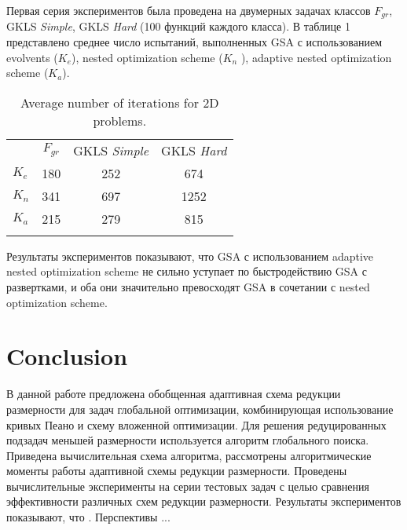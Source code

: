 \documentclass[runningheads]{llncs}
\begin{document}
Первая серия экспериментов была проведена на двумерных задачах классов $F_{gr}$, GKLS \textit{Simple}, GKLS \textit{Hard} (100 функций каждого класса). В таблице 1  представлено среднее число испытаний, выполненных GSA с использованием evolvents ($K_e$), nested optimization scheme ($K_n$ ), adaptive nested optimization scheme ($K_a$).

\begin{table}
\centering
\caption{Average number of iterations for 2D problems.}\label{tab1}
\begin{tabular}{lccc}
\hline\noalign{\smallskip}
 &  $F_{gr}$  &  GKLS \textit{Simple} &  GKLS \textit{Hard} \\
\noalign{\smallskip}\hline\noalign{\smallskip}
 $K_e$ & 180  & 252 & 674 \\
 $K_n$ & 341  & 697 & 1252 \\
 $K_a$ & 215  & 279 & 815 \\
\noalign{\smallskip}\hline
\end{tabular}
\end{table}


Результаты экспериментов показывают, что GSA с использованием adaptive nested optimization scheme не сильно уступает по быстродействию GSA с развертками, и оба они значительно превосходят GSA в сочетании с nested optimization scheme. 


\section{Conclusion}

В данной работе предложена обобщенная адаптивная схема редукции размерности для задач глобальной оптимизации, комбинирующая использование кривых Пеано и схему вложенной оптимизации. Для решения редуцированных подзадач меньшей размерности используется алгоритм глобального поиска. Приведена вычислительная схема алгоритма, рассмотрены алгоритмические моменты работы адаптивной схемы редукции размерности.
Проведены вычислительные эксперименты на серии тестовых задач с целью сравнения эффективности различных схем редукции размерности. 
Результаты экспериментов показывают, что . 
Перспективы ...


%
%
%
 
 
\end{document}
